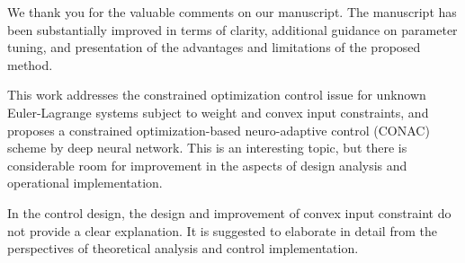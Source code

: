 \documentclass[12pt,english]{reviewresponse}
\begin{document}
\begin{concludingresponse}[]
	We thank you for the valuable comments on our manuscript. 
  The manuscript has been substantially improved in terms of clarity, additional guidance on parameter tuning, and presentation of the advantages and limitations of the proposed method.
\end{concludingresponse}

\reviewer
\begin{generalcomment}
	This work addresses the constrained optimization control issue for unknown Euler-Lagrange systems subject to weight and convex input constraints, and proposes a constrained optimization-based neuro-adaptive control (CONAC) scheme by deep neural network. This is an interesting topic, but there is considerable room for improvement in the aspects of design analysis and operational implementation. 
\end{generalcomment}

% 
\begin{revcomment}[2][1]{}
	In the control design, the design and improvement of convex input constraint do not provide a clear explanation. It is suggested to elaborate in detail from the perspectives of theoretical analysis and control implementation.
\end{revcomment}
\end{document}
